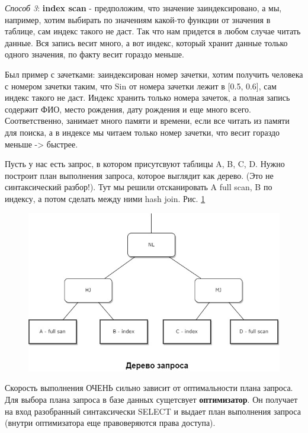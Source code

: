 \begin{enumerate}
\textit{Способ 3}: \textbf{index scan} - предположим, что значение заиндексировано, а мы, например, хотим выбирать по значениям какой-то функции от значения в таблице, сам индекс такого не даст. Так что нам придется в любом случае читать данные. Вся запись весит много, а вот индекс, который хранит данные только одного значения, по факту весит гораздо меньше. 

Был пример с зачетками: заиндексирован номер зачетки, хотим получить человека с номером зачетки таким, что Sin от номера зачетки лежит в [0.5, 0.6], сам индекс такого не даст. Индекс хранить только номера зачеток, а полная запись содержит ФИО, место рождения, дату рождения и еще много всего. Соответственно, занимает много памяти и времени, если все читать из памяти для поиска, а в индексе мы читаем только номер зачетки, что весит гораздо меньше -> быстрее. 


\end{enumerate}


Пусть у нас есть запрос, в котором присутсвуют таблицы A, B, C, D. Нужно построит план выполнения запроса, которое выглядит как дерево. (Это не синтаксический разбор!). Тут мы решили отсканировать A full scan, B по индексу, а потом сделать между ними hash join. Рис. \ref{fig:plan1}

\begin{figure}[h!]
    \centering
    \includegraphics[scale = 0.5]{5/plan.jpg}
    \label{fig:plan1}
    \caption{}
\end{figure}

Скорость выполнения ОЧЕНЬ сильно зависит от оптимальности плана запроса.
\\[20pt]
Для выбора плана запроса в базе данных сущетсвует \textbf{оптимизатор}. Он получает на вход разобранный синтаксически SELECT и выдает план выполнения запроса (внутри оптимизатора еще правоверяются права доступа). 

